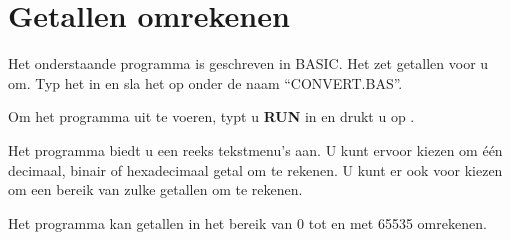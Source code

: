 \section{Getallen omrekenen}

Het onderstaande programma is geschreven in BASIC. Het zet getallen voor u om. Typ het in en sla het op onder de naam ``CONVERT.BAS''.

Om het programma uit te voeren, typt u {\bf RUN} in en drukt u op .

Het programma biedt u een reeks tekstmenu's aan. U kunt ervoor kiezen om één decimaal, binair of hexadecimaal getal om te rekenen. U kunt er ook voor kiezen om een bereik van zulke getallen om te rekenen.

Het programma kan getallen in het bereik van 0 tot en met 65535 omrekenen.

